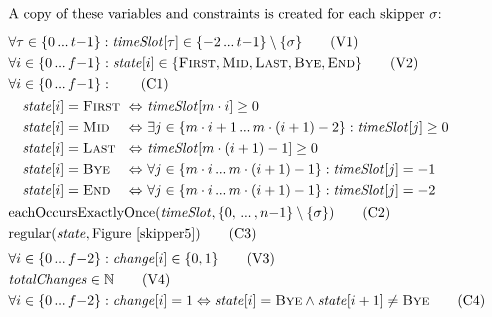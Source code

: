 \documentclass{llncs}
\newcommand{\timeSlot}{\mathit{timeSlot}}
\newcommand{\state}{\mathit{state}}
\newcommand{\change}{\mathit{change}}
\newcommand{\totalChanges}{\mathit{totalChanges}}
\newcommand{\FIRST}{\textnormal{\textsc{First}}}
\newcommand{\MID}{\textnormal{\textsc{Mid}}}
\newcommand{\LAST}{\textnormal{\textsc{Last}}}
\newcommand{\END}{\textnormal{\textsc{End}}}
\newcommand{\BYE}{\textnormal{\textsc{Bye}}}
\newcommand{\eachOccursExactlyOnce}{\mathrm{eachOccursExactlyOnce}}
\newcommand{\regular}{\mathrm{regular}}
\newcommand\nldots{\,\hbox to 0.8em{.\hss.\hss.}\,}
\begin{document}
\begin{figure}[p]
\setlength{\mathindent}{1em}
\setlength{\abovedisplayskip}{0pt}
\setlength{\belowdisplayskip}{0pt}
\setlength{\abovecaptionskip}{0pt}
\begin{framed}
\begin{align}
    \intertext{A copy of these variables and constraints is created for each skipper $\sigma$:\smallskip}
    &\forall \tau \in \{0 \nldots t{-}1\}: \timeSlot[{\tau}] \in \{{-}2 \nldots t{-}1\} \setminus \{\sigma\} \label{var:timeSlot} \tag{V1} \\
    &\forall i \in \{0 \nldots f{-}1\}: \state[{i}] \in \{\FIRST,\MID,\LAST,\BYE,\END\} \label{var:state} \tag{V2} \\
    &\forall i \in \{0 \nldots f{-}1\}: \label{C1} \tag{C1} \\
    &\begin{alignedat}{3}
    &\hspace*{1em} \state[{i}] = \FIRST &\ &\Leftrightarrow&&\ \timeSlot[{m \cdot i}] \geq 0 \\
    &\hspace*{1em} \state[{i}] = \MID   &\ &\Leftrightarrow&&\ \exists j \in \{m \cdot i + 1 \nldots m \cdot (i + 1) - 2\} : \timeSlot[{j}] \geq 0 \\
    &\hspace*{1em} \state[{i}] = \LAST  &\ &\Leftrightarrow&&\ \timeSlot[m \cdot (i + 1) - 1] \geq 0 \\
    &\hspace*{1em} \state[{i}] = \BYE   &\ &\Leftrightarrow&&\ \forall j \in \{m \cdot i \nldots m \cdot (i + 1) - 1\} : \timeSlot[j] = -1 \\
    &\hspace*{1em} \state[{i}] = \END   &\ &\Leftrightarrow&&\ \forall j \in \{m \cdot i \nldots m \cdot (i + 1) - 1\} : \timeSlot[j] = -2
    \end{alignedat} \nonumber \\
    &\eachOccursExactlyOnce(\timeSlot, \{0, \nldots, n{-}1\} \setminus \{\sigma\}) \label{C2} \tag{C2} \\
    & \regular(\state, \textnormal{Figure~\ref{skipper5}}) \label{C3} \tag{C3} \\[0.1cm]
    & \forall i \in \{0 \nldots f{-}2\}: \change[{i}] \in \{0,1\} \label{V3} \tag{V3} \\
    & \totalChanges \in \mathbb{N} \label{V4} \tag{V4} \\
    & \forall i \in \{0 \nldots f{-}2\}: \change[{i}] = 1 \Leftrightarrow \state[{i}] = \BYE \wedge \state[{i + 1}] \neq \BYE \label {C4} \tag{C4} \\

\end{align}
\end{framed}
\end{figure}
\end{document}
